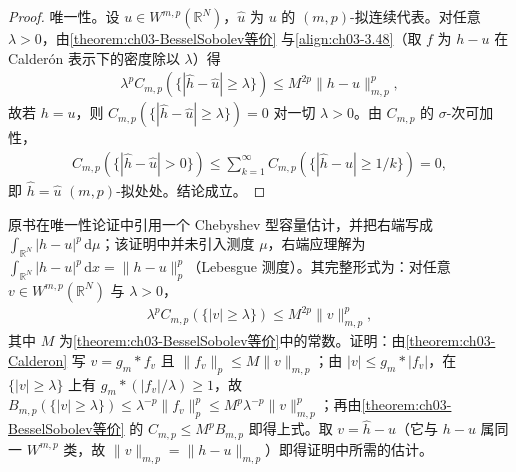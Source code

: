 \documentclass[../../main.tex]{subfiles}%
\begin{document}
\begin{proof}
唯一性。设 $u\in W^{m,p}(\mathbb{R}^N)$，$\widehat u$ 为 $u$ 的 $(m,p)$-拟连续代表。对任意 $\lambda>0$，由\cref{theorem:ch03-BesselSobolev等价} 与\eqref{align:ch03-3.48}（取 $f$ 为 $h-u$ 在 Calderón 表示下的密度除以 $\lambda$）得
\begin{align*}
\lambda^pC_{m,p}(\{|\widehat h-\widehat u|\geqslant\lambda\})\leqslant M^{2p}\|h-u\|_{m,p}^p,
\end{align*}
故若 $h=u$，则 $C_{m,p}(\{|\widehat h-\widehat u|\geqslant\lambda\})=0$ 对一切 $\lambda>0$。由 $C_{m,p}$ 的 $\sigma$-次可加性，
\begin{align*}
C_{m,p}(\{|\widehat h-\widehat u|>0\})\leqslant\sum_{k=1}^{\infty}C_{m,p}\left(\{|\widehat h-\widehat u|\geqslant1/k\}\right)=0,
\end{align*}
即 $\widehat h=\widehat u$ $(m,p)$-拟处处。结论成立。
\end{proof}

\begin{remark}\label{remark:ch03-Chebyshev容量估计}
原书在唯一性论证中引用一个 Chebyshev 型容量估计，并把右端写成 $\int_{\mathbb{R}^N}|h-u|^p\,\mathrm{d}\mu$；该证明中并未引入测度 $\mu$，右端应理解为 $\int_{\mathbb{R}^N}|h-u|^p\,\mathrm{d}x=\|h-u\|_p^p$（Lebesgue 测度）。其完整形式为：对任意 $v\in W^{m,p}(\mathbb{R}^N)$ 与 $\lambda>0$，
\begin{align*}
\lambda^pC_{m,p}(\{|v|\geqslant\lambda\})\leqslant M^{2p}\|v\|_{m,p}^p,
\end{align*}
其中 $M$ 为\cref{theorem:ch03-BesselSobolev等价}中的常数。证明：由\cref{theorem:ch03-Calderon} 写 $v=g_m*f_v$ 且 $\|f_v\|_p\leqslant M\|v\|_{m,p}$；由 $|v|\leqslant g_m*|f_v|$，在 $\{|v|\geqslant\lambda\}$ 上有 $g_m*(|f_v|/\lambda)\geqslant1$，故 $B_{m,p}(\{|v|\geqslant\lambda\})\leqslant\lambda^{-p}\|f_v\|_p^p\leqslant M^p\lambda^{-p}\|v\|_{m,p}^p$；再由\cref{theorem:ch03-BesselSobolev等价} 的 $C_{m,p}\leqslant M^pB_{m,p}$ 即得上式。取 $v=\widehat h-\widehat u$（它与 $h-u$ 属同一 $W^{m,p}$ 类，故 $\|v\|_{m,p}=\|h-u\|_{m,p}$）即得证明中所需的估计。
\end{remark}
\end{document}
